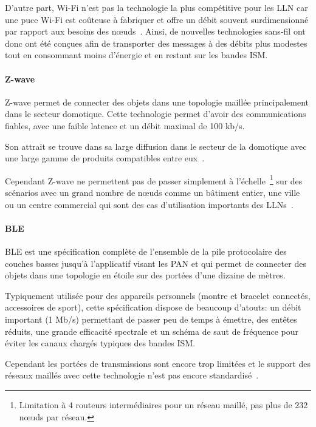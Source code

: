 D'autre part, Wi-Fi n'est pas la technologie la plus compétitive pour les \ac{LLN} car une puce Wi-Fi est coûteuse à fabriquer et offre un débit souvent surdimensionné par rapport aux besoins des nœuds~\cite{wifiCritic}.
Ainsi, de nouvelles technologies sans-fil ont donc ont été conçues afin de transporter des messages à des débits plus modestes tout en consommant moins d'énergie et en restant sur les bandes \ac{ISM}.

\paragraph{Z-wave}

Z-wave permet de connecter des objets dans une topologie maillée principalement dans le secteur domotique.
Cette technologie permet d'avoir des communications fiables, avec une faible latence et un débit maximal de 100 kb/s.

Son attrait se trouve dans sa large diffusion dans le secteur de la domotique avec une large gamme de produits compatibles entre eux~\cite{zwaveCritic}.

Cependant Z-wave ne permettent pas de passer simplement à l'échelle~\footnote{Limitation à 4 routeurs intermédiaires pour un réseau maillé, pas plus de 232 nœuds par réseau.} sur des scénarios avec un grand nombre de nœuds comme un bâtiment entier, une ville ou un centre commercial qui sont des cas d'utilisation importants des \ac{LLN}s~\cite{zwaveCritic}.

\paragraph{\ac{BLE}}

\ac{BLE} est une spécification complète de l'ensemble de la pile protocolaire des couches basses jusqu'à l'applicatif visant les \ac{PAN} et qui permet de connecter des objets dans une topologie en étoile sur des portées d'une dizaine de mètres.

Typiquement utilisée pour des appareils personnels (montre et bracelet connectés, accessoires de sport), cette spécification dispose de beaucoup d'atouts: un débit important (1 Mb/s) permettant de passer peu de temps à émettre, des entêtes réduits, une grande efficacité spectrale et un schéma de saut de fréquence pour éviter les canaux chargés typiques des bandes \ac{ISM}.

Cependant les portées de transmissions sont encore trop limitées et le support des réseaux maillés avec cette technologie n'est pas encore standardisé~\cite{bleCritic}.

